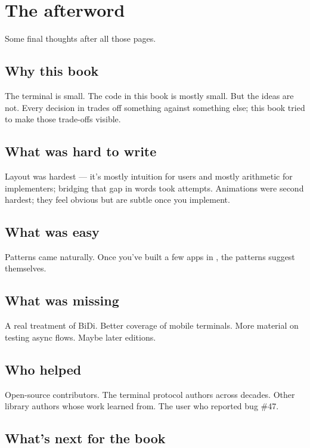 \chapter{The afterword}
\label{ch:afterword}

\begin{aside}
Some final thoughts after all those pages.
\end{aside}

\section{Why this book}

The terminal is small. The code in this book is mostly
small. But the ideas are not. Every decision in \maya{}
trades off something against something else; this book
tried to make those trade-offs visible.

\section{What was hard to write}

Layout was hardest --- it's mostly intuition for users
and mostly arithmetic for implementers; bridging that gap
in words took attempts. Animations were second hardest;
they feel obvious but are subtle once you implement.

\section{What was easy}

Patterns came naturally. Once you've built a few apps in
\maya{}, the patterns suggest themselves.

\section{What was missing}

A real treatment of BiDi. Better coverage of mobile
terminals. More material on testing async flows. Maybe
later editions.

\section{Who helped}

Open-source contributors. The terminal protocol authors
across decades. Other library authors whose work
\maya{} learned from. The user who reported bug \#47.

\section{What's next for the book}

